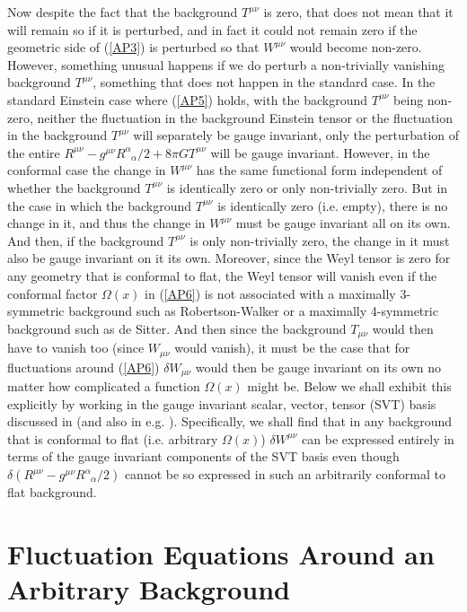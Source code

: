 \documentclass[aps]{revtex4}
\begin{document}
Now despite the fact that the background $T^{\mu\nu}$ is zero, that does not mean that it will remain so if it is perturbed, and in fact it could not remain zero if the geometric side of (\ref{AP3}) is perturbed so that $W^{\mu\nu}$ would become non-zero. However, something unusual happens if we do perturb a non-trivially vanishing background $T^{\mu\nu}$, something that does not happen in the standard case. In the standard Einstein case where (\ref{AP5}) holds, with the background $T^{\mu\nu}$ being non-zero, neither the fluctuation in the background Einstein tensor or the fluctuation in the background $T^{\mu\nu}$ will separately be gauge invariant, only the perturbation of the entire $R^{\mu\nu} -g^{\mu\nu}R^{\alpha}_{\phantom{\alpha}\alpha}/2+8\pi GT^{\mu\nu}$ will be gauge invariant.  However, in the conformal case the change in $W^{\mu\nu}$ has the same functional form independent of whether the background $T^{\mu\nu}$ is identically zero or only non-trivially zero. But in the case in which the background $T^{\mu\nu}$ is identically zero (i.e. empty), there is no change in it, and thus the change in $W^{\mu\nu}$ must be gauge invariant all on its own. And then, if the background $T^{\mu\nu}$ is only non-trivially zero, the change in it must also be gauge invariant on it its own. Moreover, since the Weyl tensor is zero for any geometry that is conformal to flat, the Weyl tensor will vanish even if the conformal factor $\Omega(x)$ in (\ref{AP6}) is not associated with a maximally 3-symmetric background such as Robertson-Walker or a maximally 4-symmetric background such as de Sitter. And then since the background $T_{\mu\nu}$ would then have to vanish too (since $W_{\mu\nu}$ would vanish), it must be the case that for fluctuations around (\ref{AP6}) $\delta W_{\mu\nu}$ would then be gauge invariant on its own no matter how complicated a function  $\Omega(x)$ might be. Below we shall exhibit this explicitly by working in the gauge invariant scalar, vector, tensor (SVT) basis discussed in \cite{Lifshitz1946,Bardeen1980} (and also in e.g. \cite{Kodama1984,Bertschinger1996}). Specifically, we shall find that in any background that is conformal to flat (i.e. arbitrary $\Omega(x)$) $\delta W^{\mu\nu}$ can be expressed entirely in terms of the gauge invariant components of the SVT basis even though $\delta(R^{\mu\nu} -g^{\mu\nu}R^{\alpha}_{\phantom{\alpha}\alpha}/2)$ cannot be so expressed in  such an arbitrarily conformal to flat background.

\section{Fluctuation Equations Around an Arbitrary Background}
\label{S3}
\end{document}
